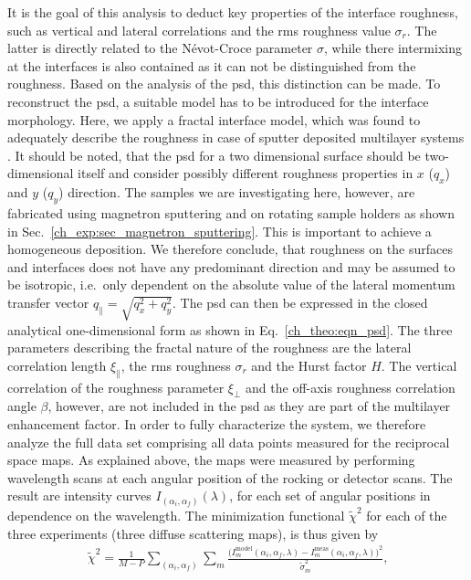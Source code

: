 It is the goal of this analysis to deduct key properties of the interface roughness, such as vertical and lateral correlations and the \gls{rms} roughness value $\sigma_r$. The latter is directly related to the N\'{e}vot-Croce parameter $\sigma$, while there intermixing at the interfaces is also contained as it can not be distinguished from the roughness. Based on the analysis of the \gls{psd}, this distinction can be made. To reconstruct the \gls{psd}, a suitable model has to be introduced for the interface morphology. Here, we apply a fractal interface model, which was found to adequately describe the roughness in case of sputter deposited multilayer systems \cite{de_boer_x-ray_1995, de_boer_x-ray_1996, sinha_x-ray_1988}. It should be noted, that the \gls{psd} for a two dimensional surface should be two-dimensional itself and consider possibly different roughness properties in $x$ ($q_x$) and $y$ ($q_y$) direction. The samples we are investigating here, however, are fabricated using magnetron sputtering and on rotating sample holders as shown in Sec.~\ref{ch_exp:sec_magnetron_sputtering}. This is important to achieve a homogeneous deposition. We therefore conclude, that roughness on the surfaces and interfaces does not have any predominant direction and may be assumed to be isotropic, i.e.~only dependent on the absolute value of the lateral momentum transfer vector $q_\parallel = \sqrt{q_x^2+q_y^2}$. The \gls{psd} can then be expressed in the closed analytical one-dimensional form as shown in Eq.~\eqref{ch_theo:eqn_psd}. The three parameters describing the fractal nature of the roughness are the lateral correlation length $\xi_\parallel$, the \gls{rms} roughness $\sigma_r$ and the Hurst factor $H$. The vertical correlation of the roughness parameter $\xi_\perp$ and the off-axis roughness correlation angle $\beta$, however, are not included in the \gls{psd} as they are part of the multilayer enhancement factor. In order to fully characterize the system, we therefore analyze the full data set comprising all data points measured for the reciprocal space maps. As explained above, the maps were measured by performing wavelength scans at each angular position of the rocking or detector scans. The result are intensity curves $I_{(\alpha_i, \alpha_f)}(\lambda)$, for each set of angular positions in dependence on the wavelength. The minimization functional $\tilde{\chi}^2$ for each of the three experiments (three diffuse scattering maps), is thus given by
\begin{align}
 \tilde{\chi}^2 = \frac{1}{M-P} \sum\limits_{(\alpha_i, \alpha_f)} \sum\limits_{m} \frac{\big(I_m^\text{model}(\alpha_i, \alpha_f, \lambda)
- I_m^\text{meas}(\alpha_i, \alpha_f, \lambda)\big)^2}{\tilde{\sigma}_m^2} \text{,}
\end{align}
